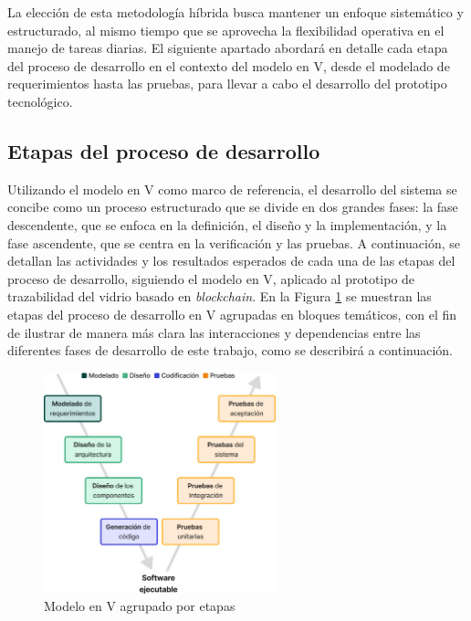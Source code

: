 La elección de esta metodología híbrida busca mantener un enfoque sistemático y estructurado, al mismo tiempo que se aprovecha la flexibilidad operativa en el manejo de tareas diarias. El siguiente apartado abordará en detalle cada etapa del proceso de desarrollo en el contexto del modelo en V, desde el modelado de requerimientos hasta las pruebas, para llevar a cabo el desarrollo del prototipo tecnológico.

\subsection{Etapas del proceso de desarrollo}

Utilizando el modelo en V como marco de referencia, el desarrollo del sistema se concibe como un proceso estructurado que se divide en dos grandes fases: la fase descendente, que se enfoca en la definición, el diseño y la implementación, y la fase ascendente, que se centra en la verificación y las pruebas. A continuación, se detallan las actividades y los resultados esperados de cada una de las etapas del proceso de desarrollo, siguiendo el modelo en V, aplicado al prototipo de trazabilidad del vidrio basado en \textit{blockchain}. En la Figura \ref{fig:methodology-v-grouped} se muestran las etapas del proceso de desarrollo en V agrupadas en bloques temáticos, con el fin de ilustrar de manera más clara las interacciones y dependencias entre las diferentes fases de desarrollo de este trabajo, como se describirá a continuación.

\begin{figure}[!b]
	\centering
	\includegraphics[width=0.6\textwidth]{Figures/model-v-grouped.png}
	\caption{Modelo en V agrupado por etapas}
    \label{fig:methodology-v-grouped}
\end{figure}


